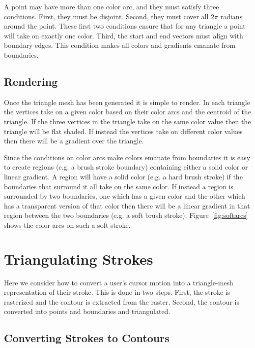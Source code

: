 \documentclass[review,draft]{acmsiggraph}
\begin{document}
A point may have more than one color arc, and they must satisfy three conditions. First, they must be disjoint. Second,
they must cover all $2\pi$ radians around the point. These first two conditions ensure that for any
triangle a point will take on exactly one color. Third, the start and end vectors must align
with boundary edges. This condition makes all colors and gradients emanate from boundaries.

\subsection{Rendering}
Once the triangle mesh has been generated it is simple to render. In each triangle the vertices
take on a given color based on their color arcs and the centroid of the triangle. If the three
vertices in the triangle take on the same color value then the triangle will be flat shaded. If instead the 
vertices take on different color values then there will be a gradient over the triangle.

Since the conditions on color arcs make colors emanate from boundaries it is easy to create regions (e.g. a brush stroke boundary)
containing either a solid color or linear gradient. A region will have a solid color (e.g. a hard brush stroke) if the
boundaries that surround it all take on the same color. If instead a region is surrounded by
two boundaries, one which has a given color and the other which has a transparent version of that color
then there will be a linear gradient in that region between the two boundaries (e.g. a soft brush stroke).
Figure~\ref{fig:softarcs} shows the color arcs on such a soft stroke.


\section{Triangulating Strokes}

Here we consider how to convert a user's cursor motion into a triangle-mesh representation
of their stroke. This is done in two steps. First, the stroke is rasterized and the
contour is extracted from the raster. Second, the contour is converted into points and
boundaries and triangulated.

\subsection{Converting Strokes to Contours}
\end{document}
